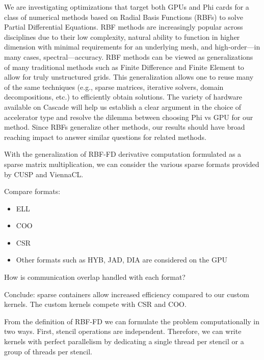 \documentclass{report}
\begin{document}
We are investigating optimizations that target both GPUs and Phi cards for a class of numerical methods based on Radial Basis Functions (RBFs) to solve Partial Differential Equations. RBF methods are increasingly popular across disciplines due to their low complexity, natural ability to function in higher dimension with minimal requirements for an underlying mesh, and high-order---in many cases, spectral---accuracy. RBF methods can be viewed as generalizations of many traditional methods such as Finite Difference and Finite Element to allow for truly unstructured grids. This generalization allows one to reuse many of the same techniques (e.g., sparse matrices, iterative solvers, domain decompositions, etc.) to efficiently obtain solutions. The variety of hardware available on Cascade will help us establish a clear argument in the choice of accelerator type and resolve the dilemma between choosing Phi vs GPU for our method. Since RBFs generalize other methods, our results should have broad reaching impact to answer similar questions for related methods.



With the generalization of RBF-FD derivative computation formulated as a sparse matrix multiplication, we can 
consider the various sparse formats provided by CUSP and ViennaCL. 


Compare formats: 
\begin{itemize}
\item ELL
\item COO
\item CSR
\item Other formats such as HYB, JAD, DIA are considered on the GPU
\end{itemize}

How is communication overlap handled with each format? 


Conclude: sparse containers allow increased efficiency compared to our custom kernels. The custom kernels compete with CSR and COO. 


From the definition of RBF-FD we can formulate the problem computationally in two ways. First, stencil operations are independent. Therefore, we can write kernels with perfect parallelism by dedicating a single thread per stencil or a group of threads per stencil.  
\end{document}
